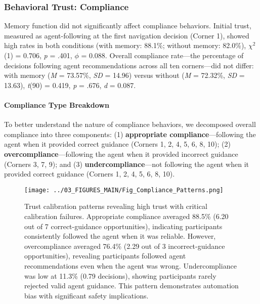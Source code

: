 \documentclass[12pt]{article}
\begin{document}
\subsubsection{Behavioral Trust: Compliance}

Memory function did not significantly affect compliance behaviors. Initial trust, measured as agent-following at the first navigation decision (Corner 1), showed high rates in both conditions (with memory: 88.1\%; without memory: 82.0\%), $\chi^2$(1) = 0.706, \textit{p} = .401, $\phi$ = 0.088. Overall compliance rate---the percentage of decisions following agent recommendations across all ten corners---did not differ: with memory (\textit{M} = 73.57\%, \textit{SD} = 14.96) versus without (\textit{M} = 72.32\%, \textit{SD} = 13.63), \textit{t}(90) = 0.419, \textit{p} = .676, \textit{d} = 0.087.

\paragraph{Compliance Type Breakdown}

To better understand the nature of compliance behaviors, we decomposed overall compliance into three components: (1) \textbf{appropriate compliance}---following the agent when it provided correct guidance (Corners 1, 2, 4, 5, 6, 8, 10); (2) \textbf{overcompliance}---following the agent when it provided incorrect guidance (Corners 3, 7, 9); and (3) \textbf{undercompliance}---not following the agent when it provided correct guidance (Corners 1, 2, 4, 5, 6, 8, 10).

\begin{figure}[h]
\centering
\texttt{[image: ../03\_FIGURES\_MAIN/Fig\_Compliance\_Patterns.png]}
\caption{Trust calibration patterns revealing high trust with critical calibration failures. Appropriate compliance averaged 88.5\% (6.20 out of 7 correct-guidance opportunities), indicating participants consistently followed the agent when it was reliable. However, overcompliance averaged 76.4\% (2.29 out of 3 incorrect-guidance opportunities), revealing participants followed agent recommendations even when the agent was wrong. Undercompliance was low at 11.3\% (0.79 decisions), showing participants rarely rejected valid agent guidance. This pattern demonstrates automation bias with significant safety implications.}
\label{fig:compliance_patterns}
\end{figure}
\end{document}
